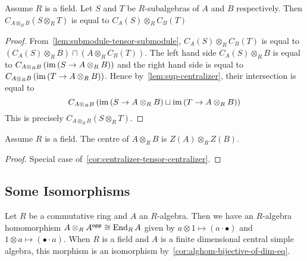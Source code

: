 \begin{corollary}\label{cor:centralizer-tensor-centralizer}
  Assume $R$ is a field. Let $S$ and $T$ be $R$-subalgebras of $A$ and $B$
  respectively. Then $C_{A\otimes_{R}B}\left(S\otimes_{R}T\right)$ is equal to
  $C_{A}(S)\otimes_{R}C_{B}(T)$
  \leanok
\end{corollary}
\begin{proof}
  From~\cref{lem:submodule-tensor-submodule}, $C_{A}(S)\otimes_{R}C_{B}(T)$ is
  equal to
  $\left(C_{A}(S)\otimes_{R} B\right)\sqcap \left(A\otimes_{R}C_{B}(T)\right)$.
  The left hand side $C_{A}(S)\otimes_{R} B$ is equal to
  $C_{A\otimes_{R}B}\left(\operatorname{im}\left(S\to A\otimes_{R}B\right)\right)$ and the
  right hand side is equal to
  $C_{A\otimes_{R}B}\left(\operatorname{im}\left(T\to A\otimes_{R}B\right)\right)$. Hence
  by~\cref{lem:sup-centralizer}, their intersection is equal to
  \[C_{A\otimes_{R}B}\left(\operatorname{im}\left(S\to A\otimes_{R} B\right)\sqcup \operatorname{im}\left(T\to A\otimes_{R}B\right)\right)\]
  This is precisely $C_{A\otimes_{R}B}\left(S\otimes_{R}T\right)$.
\end{proof}

\begin{corollary}
  \label{cor:center-tensor-center}
  Assume $R$ is a field. The centre of $A\otimes_{R} B$ is
  $Z\left(A\right)\otimes_{R}Z\left(B\right)$. 
  \leanok
\end{corollary}
\begin{proof}
  Special case of~\cref{cor:centralizer-tensor-centralizer}.
\end{proof}

\subsection{Some Isomorphisms}

\begin{construction}
  \label{con:self-tensor-opp-iso-end}
  Let $R$ be a commutative ring and $A$ an $R$-algebra. Then we
  have an $R$-algebra homomorphism $A\otimes_{R}A^{\mathsf{opp}} \cong \operatorname{End}_{R}A$ given
  by $a\otimes 1 \mapsto (a\cdot\bullet)$ and
  $1\otimes a \mapsto (\bullet\cdot a)$. When $R$ is a field and $A$ is a finite dimensional central simple algebra, this morphism is an isomorphism by~\cref{cor:alghom-bijective-of-dim-eq}.
\end{construction}

